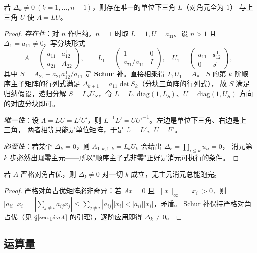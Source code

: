 \begin{theorem}[无主元 LU 分解]
\label{thm:lu-exists}
若 $\Delta_k\ne0\ (k=1,\dots,n-1)$，则存在唯一的单位下三角 $L$（对角元全为 $1$）
与上三角 $U$ 使 $A=LU$。
\end{theorem}

\begin{proof}
\emph{存在性}：对 $n$ 作归纳。$n=1$ 时取 $L=1,U=a_{11}$。设 $n>1$ 且 $\Delta_1=a_{11}\ne0$，写分块形式
\[
  A=\begin{pmatrix} a_{11} & a_{12}^{\mathsf T}\\ a_{21} & A_{22}\end{pmatrix},
  \qquad
  L_1=\begin{pmatrix}1&0\\ a_{21}/a_{11} & I\end{pmatrix},\quad
  U_1=\begin{pmatrix}a_{11}&a_{12}^{\mathsf T}\\ 0 & S\end{pmatrix},
\]
其中 $S=A_{22}-a_{21}a_{12}^{\mathsf T}/a_{11}$ 是 \textbf{Schur 补}。直接相乘得 $L_1U_1=A$。
$S$ 的第 $k$ 阶顺序主子矩阵的行列式满足 $\Delta_{k+1}=a_{11}\det S_k$（分块三角阵的行列式），
故 $S$ 满足归纳假设，递归分解 $S=L_SU_S$，令 $L=L_1\,\mathrm{diag}(1,L_S)$、$U=\mathrm{diag}(1,U_S)$
方向的对应分块即可。

\emph{唯一性}：设 $A=LU=L'U'$，则 $L^{-1}L'=UU'^{-1}$。左边是单位下三角、右边是上三角，
两者相等只能是单位矩阵，于是 $L=L'$、$U=U'$。

\emph{必要性}：若某个 $\Delta_k=0$，则 $A_{1:k,1:k}=L_kU_k$ 会给出 $\Delta_k=\prod_{i\le k}u_{ii}=0$，
消元第 $k$ 步必然出现零主元——所以"顺序主子式非零"正好是消元可执行的条件。
\end{proof}

\begin{corollary}[对角占优是充分条件]
若 $A$ 严格对角占优，则 $\Delta_k\ne0$ 对一切 $k$ 成立，无主元消元总能跑完。
\end{corollary}

\begin{proof}
严格对角占优矩阵必非奇异：若 $Ax=0$ 且 $\|x\|_\infty=|x_i|>0$，则
$|a_{ii}||x_i|=|\sum_{j\ne i}a_{ij}x_j|\le\sum_{j\ne i}|a_{ij}||x_i|<|a_{ii}||x_i|$，矛盾。
Schur 补保持严格对角占优（见 \S\ref{sec:pivot} 的引理），逐阶应用即得 $\Delta_k\ne0$。
\end{proof}

\subsection{运算量}

